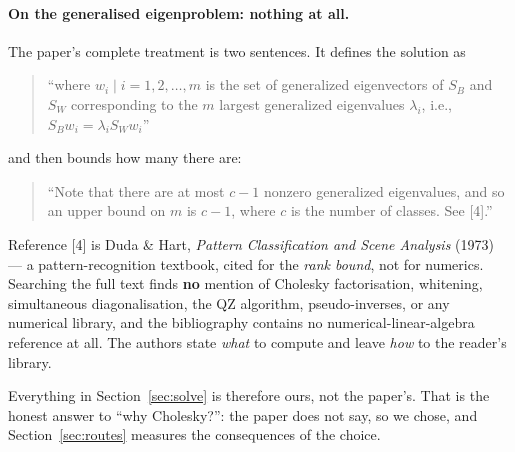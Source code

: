 \documentclass[11pt]{article}
\theoremstyle{definition}
\theoremstyle{remark}
\newcommand{\Sw}{S_W}
\newcommand{\Sb}{S_B}
\begin{document}
\paragraph{On the generalised eigenproblem: nothing at all.}
The paper's complete treatment is two sentences. It defines the solution as
\begin{quote}
``where $w_i \mid i=1,2,\ldots,m$ is the set of generalized eigenvectors of
$\Sb$ and $\Sw$ corresponding to the $m$ largest generalized eigenvalues
$\lambda_i$, i.e., $\Sb w_i = \lambda_i \Sw w_i$''
\end{quote}
and then bounds how many there are:
\begin{quote}
``Note that there are at most $c-1$ nonzero generalized eigenvalues, and so an
upper bound on $m$ is $c-1$, where $c$ is the number of classes. See [4].''
\end{quote}
Reference [4] is Duda \& Hart, \emph{Pattern Classification and Scene
Analysis} (1973) --- a pattern-recognition textbook, cited for the \emph{rank
bound}, not for numerics. Searching the full text finds \textbf{no} mention of
Cholesky factorisation, whitening, simultaneous diagonalisation, the QZ
algorithm, pseudo-inverses, or any numerical library, and the bibliography
contains no numerical-linear-algebra reference at all. The authors state
\emph{what} to compute and leave \emph{how} to the reader's library.

Everything in Section~\ref{sec:solve} is therefore ours, not the paper's. That
is the honest answer to ``why Cholesky?'': the paper does not say, so we chose,
and Section~\ref{sec:routes} measures the consequences of the choice.
\end{document}
